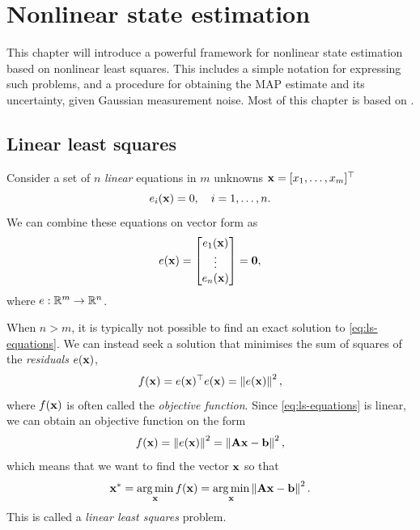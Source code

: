 \chapter{Nonlinear state estimation} \label{ch:nls}
This chapter will introduce a powerful framework for nonlinear state estimation based on nonlinear least squares.
This includes a simple notation for expressing such problems, and a procedure for obtaining the MAP estimate and its uncertainty, given Gaussian measurement noise.
Most of this chapter is based on \cite{Dellaert2017, barfoot2017state}.

\section{Linear least squares}
Consider a set of $n$ \emph{linear} equations in $m$ unknowns ${\boldsymbol{\mathbf{x}}} = [x_1, \ldots, x_m]^{\top}$
\begin{equation}
  e_i({\boldsymbol{\mathbf{x}}}) = 0, \quad i = 1, \ldots, n.
\end{equation}
We can combine these equations on vector form as
\begin{equation} \label{eq:ls-equations}
  e({\boldsymbol{\mathbf{x}}}) = 
  \begin{bmatrix}
    e_1({\boldsymbol{\mathbf{x}}})\\
    \vdots\\
    e_n({\boldsymbol{\mathbf{x}}})
  \end{bmatrix}
  = \boldsymbol{\mathbf{0}},
\end{equation}
where $e: {\mathbb R}^m \to {\mathbb R}^n$.

When $n > m$, it is typically not possible to find an exact solution to \eqref{eq:ls-equations}.
We can instead seek a solution that minimises the sum of squares of the \emph{residuals} $e({\boldsymbol{\mathbf{x}}})$,
\begin{equation}
  f({\boldsymbol{\mathbf{x}}}) = e({\boldsymbol{\mathbf{x}}})^{\top} e({\boldsymbol{\mathbf{x}}}) = \left\lVert e({\boldsymbol{\mathbf{x}}})\right\rVert^2,
\end{equation}
where $f({\boldsymbol{\mathbf{x}}})$ is often called the \emph{objective function}.
Since \eqref{eq:ls-equations} is linear, we can obtain an objective function on the form
\begin{equation} \label{eq:objective-form}
  f({\boldsymbol{\mathbf{x}}}) = \left\lVert e({\boldsymbol{\mathbf{x}}})\right\rVert^2 = \left\lVert{\boldsymbol{\mathbf{A}}}{\boldsymbol{\mathbf{x}}} - {\boldsymbol{\mathbf{b}}}\right\rVert^2,
\end{equation}
which means that we want to find the vector ${\boldsymbol{\mathbf{x}}}$ so that
\begin{equation} \label{eq:ls-min-residual}
  {\boldsymbol{\mathbf{x}}}^\ast = \operatorname*{arg\,min}_{\boldsymbol{\mathbf{x}}} f({\boldsymbol{\mathbf{x}}}) = \operatorname*{arg\,min}_{\boldsymbol{\mathbf{x}}} \left\lVert{\boldsymbol{\mathbf{A}}}{\boldsymbol{\mathbf{x}}} - {\boldsymbol{\mathbf{b}}}\right\rVert^2.
\end{equation}
This is called a \emph{linear least squares} problem.


